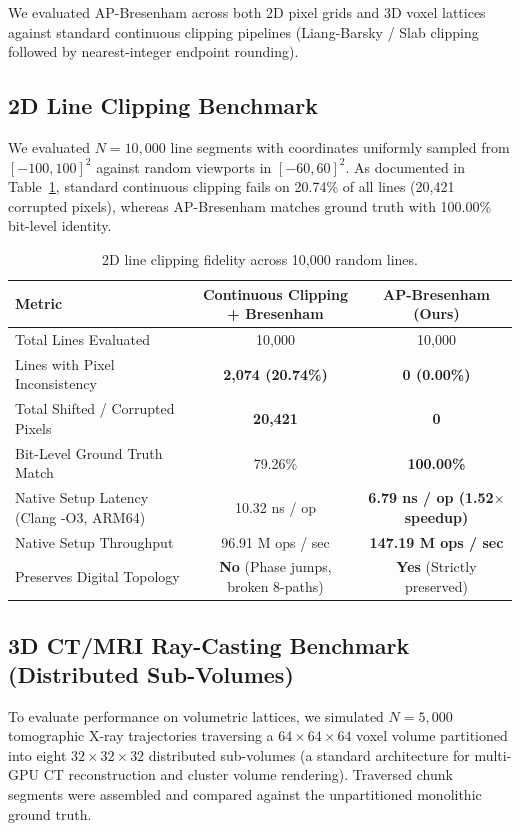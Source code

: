 \documentclass[runningheads]{llncs}
\begin{document}
We evaluated AP-Bresenham across both 2D pixel grids and 3D voxel lattices against standard continuous clipping pipelines (Liang-Barsky / Slab clipping followed by nearest-integer endpoint rounding).

\subsection{2D Line Clipping Benchmark}
We evaluated $N = 10,000$ line segments with coordinates uniformly sampled from $[-100, 100]^2$ against random viewports in $[-60, 60]^2$. As documented in Table~\ref{tab:results_2d}, standard continuous clipping fails on 20.74\% of all lines (20,421 corrupted pixels), whereas AP-Bresenham matches ground truth with 100.00\% bit-level identity.

\begin{table}[h]
\centering
\caption{2D line clipping fidelity across 10,000 random lines.}
\label{tab:results_2d}
\begin{tabular}{lcc}
\toprule
\textbf{Metric} & \textbf{Continuous Clipping + Bresenham} & \textbf{AP-Bresenham (Ours)} \\
\midrule
Total Lines Evaluated & 10,000 & 10,000 \\
Lines with Pixel Inconsistency & \textbf{2,074 (20.74\%)} & \textbf{0 (0.00\%)} \\
Total Shifted / Corrupted Pixels & \textbf{20,421} & \textbf{0} \\
Bit-Level Ground Truth Match & 79.26\% & \textbf{100.00\%} \\
Native Setup Latency (Clang -O3, ARM64) & 10.32 ns / op & \textbf{6.79 ns / op (1.52$\times$ speedup)} \\
Native Setup Throughput & 96.91 M ops / sec & \textbf{147.19 M ops / sec} \\
Preserves Digital Topology & \textbf{No} (Phase jumps, broken 8-paths) & \textbf{Yes} (Strictly preserved) \\
\bottomrule
\end{tabular}
\end{table}

\subsection{3D CT/MRI Ray-Casting Benchmark (Distributed Sub-Volumes)}
To evaluate performance on volumetric lattices, we simulated $N = 5,000$ tomographic X-ray trajectories traversing a $64 \times 64 \times 64$ voxel volume partitioned into eight $32 \times 32 \times 32$ distributed sub-volumes (a standard architecture for multi-GPU CT reconstruction and cluster volume rendering). Traversed chunk segments were assembled and compared against the unpartitioned monolithic ground truth.
\end{document}
